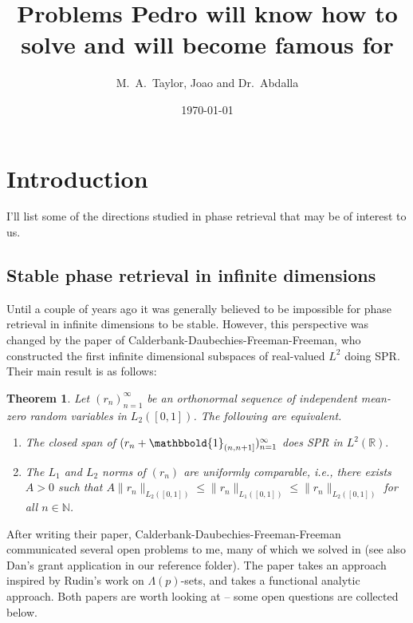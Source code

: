\documentclass[12pt,leqno]{amsart}
\title[Problems Pedro will know how to solve]{Problems Pedro will know how to solve and will become famous for}
\author{M.~A.\ Taylor, Joao and Dr.~Abdalla}
\date{\today}
\numberwithin{equation}{section}
\theoremstyle{plain}
\newtheorem{theorem}{Theorem}[section]
\theoremstyle{definition}
\def\one{\mathbbold{1}}
\begin{document}
\begin{abstract}
  
\end{abstract}

\maketitle
\allowdisplaybreaks
\tableofcontents

\setlength\parindent{0pt}
\section{Introduction}

I'll list some of the directions studied in phase retrieval that may be of interest to us.


\subsection{Stable phase retrieval in infinite dimensions}
Until a couple of years ago it was generally believed to be impossible for phase retrieval in infinite dimensions to be stable. However, this perspective was changed by the paper \cite{calderbank2022stable} of Calderbank-Daubechies-Freeman-Freeman, who constructed the first infinite dimensional subspaces of real-valued $L^2$ doing SPR. Their main result is as follows:
\begin{theorem}
Let $(r_n)_{n=1}^\infty$ be an orthonormal sequence of independent mean-zero random variables in $L_2([0,1])$. The following are equivalent.
\begin{enumerate}
\item The closed span of $(r_n+\one_{(n,n+1]})_{n=1}^\infty$ does SPR in $L^2(\mathbb{R}).$
\item The $L_1$ and $L_2$ norms of $(r_n)$ are uniformly comparable, i.e., there exists $A>0$ such that $A\|r_n\|_{L_2([0,1])}\leq \|r_n\|_{L_1([0,1])}\leq \|r_n\|_{L_2([0,1])}$ for all $n\in \mathbb{N}$.
\end{enumerate}
\end{theorem}
After writing their paper, Calderbank-Daubechies-Freeman-Freeman communicated several open problems to me, many of which we solved in \cite{Stable, Stablephaseretrieval} (see also Dan's grant application in our reference folder). The paper \cite{Stable} takes an approach inspired by Rudin's work on $\Lambda(p)$-sets, and \cite{Stablephaseretrieval} takes a functional analytic approach. Both papers are worth looking at -- some open questions are collected below.
\end{document}
